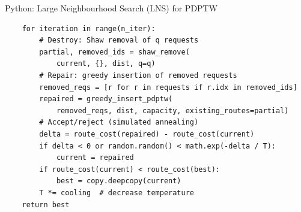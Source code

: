 \documentclass[aspectratio=169,10pt]{beamer}
\begin{document}
\begin{frame}[fragile]{Python: Large Neighbourhood Search (LNS) for PDPTW}
\begin{lstlisting}
    for iteration in range(n_iter):
        # Destroy: Shaw removal of q requests
        partial, removed_ids = shaw_remove(
            current, {}, dist, q=q)
        # Repair: greedy insertion of removed requests
        removed_reqs = [r for r in requests if r.idx in removed_ids]
        repaired = greedy_insert_pdptw(
            removed_reqs, dist, capacity, existing_routes=partial)
        # Accept/reject (simulated annealing)
        delta = route_cost(repaired) - route_cost(current)
        if delta < 0 or random.random() < math.exp(-delta / T):
            current = repaired
        if route_cost(current) < route_cost(best):
            best = copy.deepcopy(current)
        T *= cooling  # decrease temperature
    return best
\end{lstlisting}
\end{frame}
\end{document}
